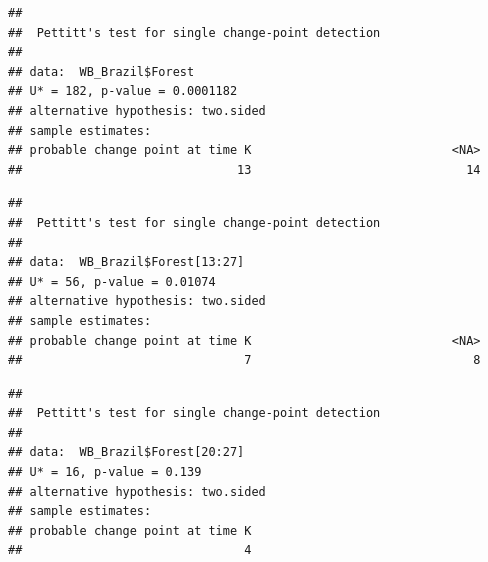 \documentclass[12pt,]{article}
\newenvironment{Shaded}{\begin{snugshade}}{\end{snugshade}}
\newcommand{\KeywordTok}[1]{\textcolor[rgb]{0.13,0.29,0.53}{\textbf{#1}}}
\newcommand{\DecValTok}[1]{\textcolor[rgb]{0.00,0.00,0.81}{#1}}
\newcommand{\CommentTok}[1]{\textcolor[rgb]{0.56,0.35,0.01}{\textit{#1}}}
\newcommand{\OperatorTok}[1]{\textcolor[rgb]{0.81,0.36,0.00}{\textbf{#1}}}
\newcommand{\NormalTok}[1]{#1}
\begin{document}
\begin{verbatim}
## 
##  Pettitt's test for single change-point detection
## 
## data:  WB_Brazil$Forest
## U* = 182, p-value = 0.0001182
## alternative hypothesis: two.sided
## sample estimates:
## probable change point at time K                            <NA> 
##                              13                              14
\end{verbatim}

\begin{Shaded}
\end{Shaded}

\begin{verbatim}
## 
##  Pettitt's test for single change-point detection
## 
## data:  WB_Brazil$Forest[13:27]
## U* = 56, p-value = 0.01074
## alternative hypothesis: two.sided
## sample estimates:
## probable change point at time K                            <NA> 
##                               7                               8
\end{verbatim}

\begin{Shaded}
\end{Shaded}

\begin{verbatim}
## 
##  Pettitt's test for single change-point detection
## 
## data:  WB_Brazil$Forest[20:27]
## U* = 16, p-value = 0.139
## alternative hypothesis: two.sided
## sample estimates:
## probable change point at time K 
##                               4
\end{verbatim}

\begin{Shaded}
\end{Shaded}
\end{document}
